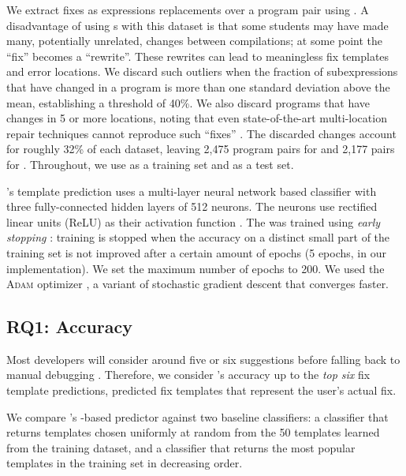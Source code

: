 %
We extract fixes as expressions replacements over a program pair using \diffsym.
A disadvantage of using \diffsym s with this dataset is that some students may
have made many, potentially unrelated, changes between compilations; at some
point the ``fix'' becomes a ``rewrite''. These rewrites can lead to meaningless
fix templates and error locations. We discard such outliers when the fraction of
subexpressions that have changed in a program is more than one standard
deviation above the mean, establishing a \diffsym threshold of 40\%. We also
discard programs that have changes in 5 or more locations, noting that even
state-of-the-art multi-location repair techniques cannot reproduce such
``fixes'' \citep{Saha_2019}. The discarded changes account for roughly 32\% of
each dataset, leaving 2,475 program pairs for \SPRING and 2,177 pairs for \FALL.
Throughout, we use \SPRING as a training set and \FALL as a test set.

%
\toolname's template prediction uses a multi-layer neural network \dnn based
classifier with three fully-connected hidden layers of 512 neurons. The neurons
use rectified linear units (ReLU) as their activation function
\citep{Nair2010-xg}.
%
The \dnn was trained using \emph{early stopping} \citep{Hastie2009-bn}: training
is stopped when the accuracy on a distinct small part of the training set is not
improved after a certain amount of epochs (5 epochs, in our implementation).
%
We set the maximum number of epochs to 200.
%
We used the \textsc{Adam} optimizer \citep{Kingma2014-ng},
a variant of stochastic gradient descent that converges faster.

\subsection{RQ1: Accuracy}

\label{sec:eval:accuracy}

Most developers will consider around five or six suggestions before falling back
to manual debugging \citep{Kochhar2016-oc,Parnin2011-ce}.
%
Therefore, we consider \toolname's accuracy up to the \emph{top six} fix
template predictions, \ie predicted fix templates that represent the user's
actual fix.

%
We compare \toolname's \dnn-based predictor against two baseline classifiers: a
\random classifier that returns templates chosen uniformly at random from the 50
templates learned from the \SPRING training dataset, and a \popular classifier
that returns the most popular templates in the training set in decreasing order.

